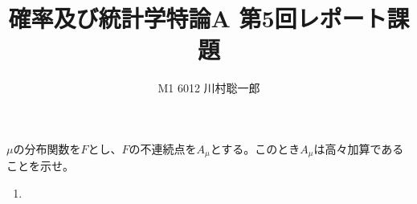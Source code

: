 \documentclass[dvipdfmx]{jsreport}
\title{確率及び統計学特論A 第5回レポート課題}
\author{M1 6012 川村聡一郎}
\date{}
\begin{document}
\maketitle

\begin{tcolorbox}
	$\mu$の分布関数を$F$とし、$F$の不連続点を$A_\mu$とする。このとき$A_\mu$は高々加算であることを示せ。
\end{tcolorbox}

\begin{souanswer} %
\begin{enumerate}
	\item 
\end{enumerate}
\end{souanswer}
\end{document}
